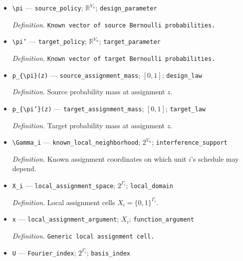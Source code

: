 \documentclass{article}
\begin{document}
\begin{itemize}
  \par\smallskip\noindent\emph{Definition.} \texttt{Target probability used in the separating hub family.}
  \item \texttt{\textbackslash{}\allowbreak{}pi} --- \texttt{source\_\allowbreak{}policy}; \(\mathbb R^{V_n}\); \texttt{design\_\allowbreak{}parameter}
  \par\smallskip\noindent\emph{Definition.} \texttt{Known vector of source Bernoulli probabilities.}
  \item \texttt{\textbackslash{}\allowbreak{}pi'} --- \texttt{target\_\allowbreak{}policy}; \(\mathbb R^{V_n}\); \texttt{target\_\allowbreak{}parameter}
  \par\smallskip\noindent\emph{Definition.} \texttt{Known vector of target Bernoulli probabilities.}
  \item \texttt{p\_\allowbreak{}\{\textbackslash{}\allowbreak{}pi\}\allowbreak{}(z)} --- \texttt{source\_\allowbreak{}assignment\_\allowbreak{}mass}; \([0,1]\); \texttt{design\_\allowbreak{}law}
  \par\smallskip\noindent\emph{Definition.} Source probability mass at assignment \(z\).
  \item \texttt{p\_\allowbreak{}\{\textbackslash{}\allowbreak{}pi'\}\allowbreak{}(z)} --- \texttt{target\_\allowbreak{}assignment\_\allowbreak{}mass}; \([0,1]\); \texttt{target\_\allowbreak{}law}
  \par\smallskip\noindent\emph{Definition.} Target probability mass at assignment \(z\).
  \item \texttt{\textbackslash{}\allowbreak{}Gamma\_\allowbreak{}i} --- \texttt{known\_\allowbreak{}local\_\allowbreak{}neighborhood}; \(2^{V_n}\); \texttt{interference\_\allowbreak{}support}
  \par\smallskip\noindent\emph{Definition.} Known assignment coordinates on which unit \(i\)'s schedule may depend.
  \item \texttt{X\_\allowbreak{}i} --- \texttt{local\_\allowbreak{}assignment\_\allowbreak{}space}; \(2^{\Gamma_i}\); \texttt{local\_\allowbreak{}domain}
  \par\smallskip\noindent\emph{Definition.} Local assignment cells \(X_i=\{0,1\}^{\Gamma_i}\).
  \item \texttt{x} --- \texttt{local\_\allowbreak{}assignment\_\allowbreak{}argument}; \(X_i\); \texttt{function\_\allowbreak{}argument}
  \par\smallskip\noindent\emph{Definition.} \texttt{Generic local assignment cell.}
  \item \texttt{U} --- \texttt{Fourier\_\allowbreak{}index}; \(2^{\Gamma_i}\); \texttt{basis\_\allowbreak{}index}

\end{itemize}
\end{document}
